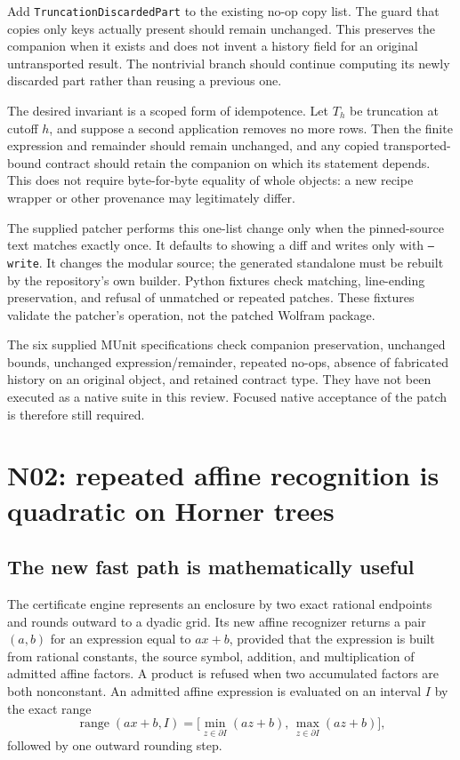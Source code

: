 \documentclass[11pt,letterpaper]{article}
\newcommand{\prop}[1]{\texttt{#1}}
\begin{document}
Add \prop{TruncationDiscardedPart} to the existing no-op copy list. The guard that
copies only keys actually present should remain unchanged. This preserves the
companion when it exists and does not invent a history field for an original
untransported result. The nontrivial branch should continue computing its newly
discarded part rather than reusing a previous one.

The desired invariant is a scoped form of idempotence. Let $T_h$ be truncation at
cutoff $h$, and suppose a second application removes no more rows. Then the finite
expression and remainder should remain unchanged, and any copied transported-bound
contract should retain the companion on which its statement depends. This does
not require byte-for-byte equality of whole objects: a new recipe wrapper or
other provenance may legitimately differ.

The supplied patcher performs this one-list change only when the pinned-source
text matches exactly once. It defaults to showing a diff and writes only with
\texttt{--write}. It changes the modular source; the generated standalone must be
rebuilt by the repository's own builder. Python fixtures check matching,
line-ending preservation, and refusal of unmatched or repeated patches. These
fixtures validate the patcher's operation, not the patched Wolfram package.

The six supplied MUnit specifications check companion preservation, unchanged
bounds, unchanged expression/remainder, repeated no-ops, absence of fabricated
history on an original object, and retained contract type. They have not been
executed as a native suite in this review. Focused native acceptance of the patch
is therefore still required.

\section{N02: repeated affine recognition is quadratic on Horner trees}
\label{sec:n02}

\subsection{The new fast path is mathematically useful}

The certificate engine represents an enclosure by two exact rational endpoints
and rounds outward to a dyadic grid. Its new affine recognizer returns a pair
$(a,b)$ for an expression equal to $ax+b$, provided that the expression is built
from rational constants, the source symbol, addition, and multiplication of
admitted affine factors. A product is refused when two accumulated factors are
both nonconstant. An admitted affine expression is evaluated on an interval $I$
by the exact range
\[
 \operatorname{range}(ax+b,I)=
 \bigl[\min_{z\in\partial I}(az+b),\,
       \max_{z\in\partial I}(az+b)\bigr],
\]
followed by one outward rounding step.\cite{certificates}
\end{document}
